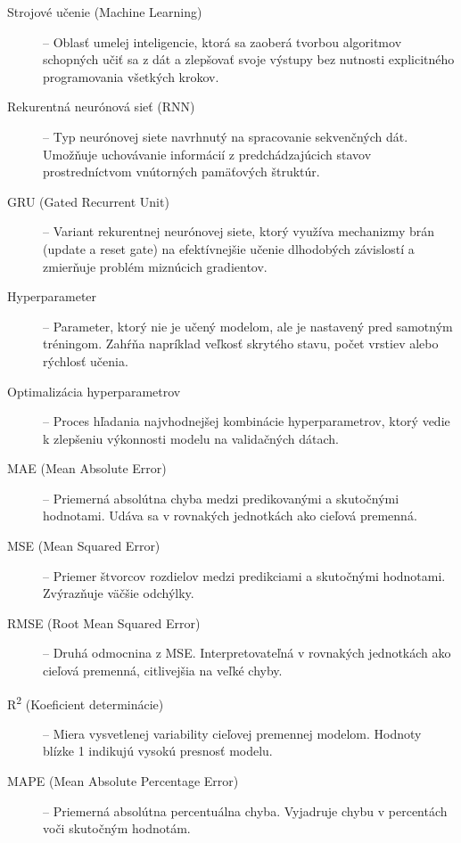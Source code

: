 \documentclass[]{KKUIzaverecnaPraca}
\begin{document}
\begin{description}
    \item [Strojové učenie (Machine Learning)] – Oblasť umelej inteligencie, ktorá sa zaoberá tvorbou algoritmov schopných učiť sa z dát a zlepšovať svoje výstupy bez nutnosti explicitného programovania všetkých krokov.

    \item [Rekurentná neurónová sieť (RNN)] – Typ neurónovej siete navrhnutý na spracovanie sekvenčných dát. Umožňuje uchovávanie informácií z predchádzajúcich stavov prostredníctvom vnútorných pamäťových štruktúr.

    \item [GRU (Gated Recurrent Unit)] – Variant rekurentnej neurónovej siete, ktorý využíva mechanizmy brán (update a reset gate) na efektívnejšie učenie dlhodobých závislostí a zmierňuje problém miznúcich gradientov.

    \item [Hyperparameter] – Parameter, ktorý nie je učený modelom, ale je nastavený pred samotným tréningom. Zahŕňa napríklad veľkosť skrytého stavu, počet vrstiev alebo rýchlosť učenia.

    \item [Optimalizácia hyperparametrov] – Proces hľadania najvhodnejšej kombinácie hyperparametrov, ktorý vedie k zlepšeniu výkonnosti modelu na validačných dátach.

    \item [MAE (Mean Absolute Error)] – Priemerná absolútna chyba medzi predikovanými a skutočnými hodnotami. Udáva sa v rovnakých jednotkách ako cieľová premenná.

    \item [MSE (Mean Squared Error)] – Priemer štvorcov rozdielov medzi predikciami a skutočnými hodnotami. Zvýrazňuje väčšie odchýlky.

    \item [RMSE (Root Mean Squared Error)] – Druhá odmocnina z MSE. Interpretovateľná v rovnakých jednotkách ako cieľová premenná, citlivejšia na veľké chyby.

    \item [R\textsuperscript{2} (Koeficient determinácie)] – Miera vysvetlenej variability cieľovej premennej modelom. Hodnoty blízke 1 indikujú vysokú presnosť modelu.

    \item [MAPE (Mean Absolute Percentage Error)] – Priemerná absolútna percentuálna chyba. Vyjadruje chybu v percentách voči skutočným hodnotám.


\end{description}
\end{document}
